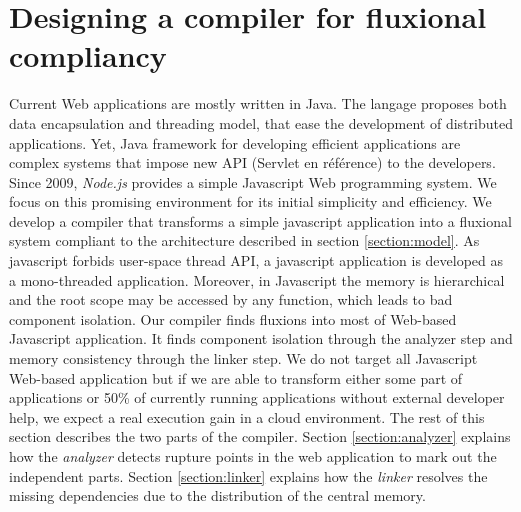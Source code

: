 \section{Designing a compiler for fluxional compliancy} \label{section:compiler}

Current Web applications are mostly written in Java. The langage proposes both data encapsulation and threading model, that ease the development of distributed applications.
Yet, Java framework for developing efficient applications are complex systems that impose new API (Servlet en référence) to the developers.
Since 2009, \textit{Node.js}\cite{Dahl} provides a simple Javascript Web programming system.
We focus on this promising environment for its initial simplicity and efficiency.
We develop a compiler that transforms a simple javascript application into a fluxional system compliant to the architecture described in section \ref{section:model}.
As javascript forbids user-space thread API, a javascript application is developed as a mono-threaded application.
Moreover, in Javascript  the memory is hierarchical and the root scope may be accessed by any function, which leads to bad component isolation.
Our compiler finds fluxions into most of Web-based Javascript application.
It finds component isolation through the analyzer step and memory consistency through the linker step.
We do not target all Javascript Web-based application but if we are able to transform either some part of applications or 50\% of currently running applications without external developer help, we expect a real execution gain in a cloud environment.
The rest of this section describes the two parts of the compiler.
Section \ref{section:analyzer} explains how the \textit{analyzer} detects rupture points in the web application to mark out the independent parts.
Section \ref{section:linker} explains how the \textit{linker} resolves the missing dependencies due to the distribution of the central memory.

